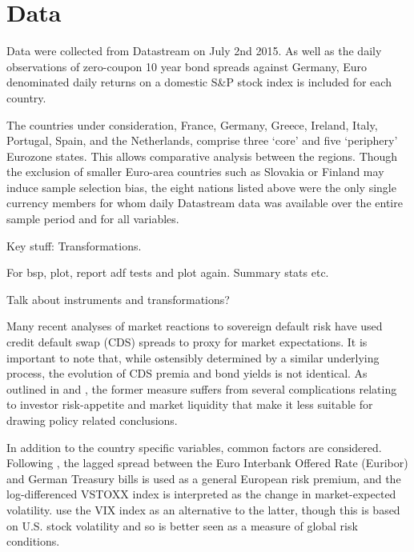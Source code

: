 \documentclass[/../base.tex]{subfiles}
\begin{document}
\section{Data}
\label{data}

Data were collected from Datastream on July 2nd 2015. As well as the daily observations of zero-coupon 10 year bond spreads against Germany, Euro denominated daily returns on a domestic S\&P stock index is included for each country.

The countries under consideration, France, Germany, Greece, Ireland, Italy, Portugal, Spain, and the Netherlands, comprise three `core' and five `periphery' Eurozone states. This allows comparative analysis between the regions. Though the exclusion of smaller Euro-area countries such as Slovakia or Finland may induce sample selection bias, the eight nations listed above were the only single currency members for whom daily Datastream data was available over the entire sample period and for all variables. 

Key stuff: Transformations. 

For bsp, plot, report adf tests and plot again. Summary stats etc. 

Talk about instruments and transformations?



Many recent analyses of market reactions to sovereign default risk have used credit default swap (CDS) spreads to proxy for market expectations. It is important to note that, while ostensibly determined by a similar underlying process, the evolution of CDS premia and bond yields is not identical. As outlined in  \cite{fontana2010analysis} and \cite{beirne2013pricing}, the former measure suffers from several complications relating to investor risk-appetite and market liquidity that make it less suitable for drawing policy related conclusions.

In addition to the country specific variables, common factors are considered. Following \cite{metiu2012sovereign}, the lagged spread between the Euro Interbank Offered Rate (Euribor) and German Treasury bills is used as a general European risk premium, and the log-differenced VSTOXX index is interpreted as the change in market-expected volatility. \cite{giordano2013pure} use the VIX index as an alternative to the latter, though this is based on U.S. stock volatility and so is better seen as a measure of global risk conditions. 


\end{document}
